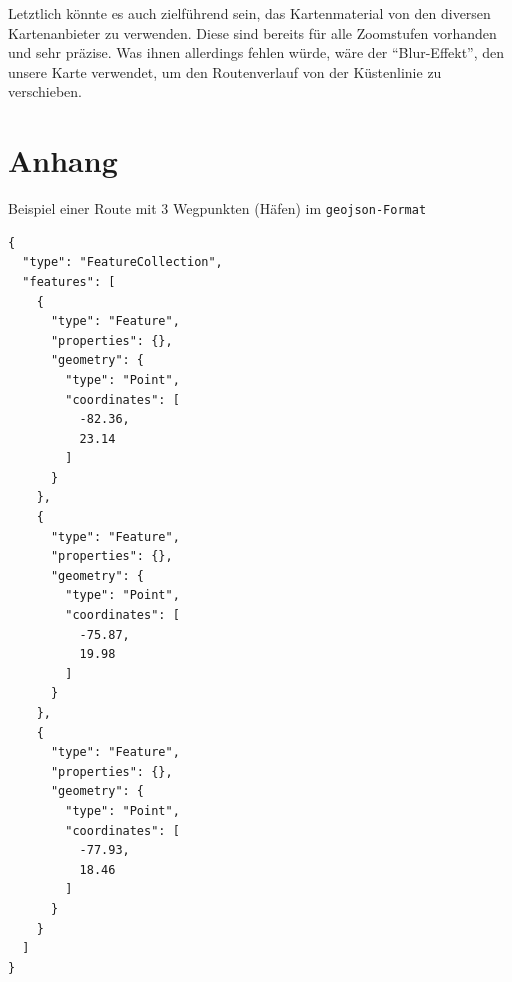 \documentclass[letterpaper]{article}
\begin{document}
		Letztlich könnte es auch zielführend sein, das Kartenmaterial von den diversen  Kartenanbieter zu verwenden. Diese sind bereits für alle Zoomstufen vorhanden und sehr präzise. Was ihnen allerdings fehlen würde, wäre der "`Blur-Effekt"', den unsere Karte verwendet, um den Routenverlauf von der Küstenlinie zu verschieben.


{\footnotesize 
}

\section{Anhang}
		Beispiel einer Route mit 3 Wegpunkten (Häfen) im \texttt{geojson-Format}

		\begin{lstlisting}[captionpos=b, caption=Beispiel Route: Kuba, label=lst:geojson_example, breaklines=false]
{
  "type": "FeatureCollection",
  "features": [
    {
      "type": "Feature",
      "properties": {},
      "geometry": {
        "type": "Point",
        "coordinates": [
          -82.36,
          23.14
        ]
      }
    },
    {
      "type": "Feature",
      "properties": {},
      "geometry": {
        "type": "Point",
        "coordinates": [
          -75.87,
          19.98
        ]
      }
    },
    {
      "type": "Feature",
      "properties": {},
      "geometry": {
        "type": "Point",
        "coordinates": [
          -77.93,
          18.46
        ]
      }
    }
  ]
}
		\end{lstlisting}
\end{document}
